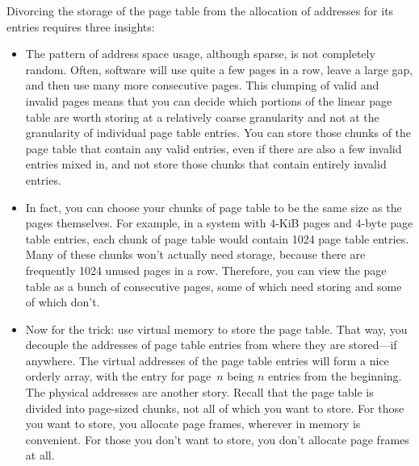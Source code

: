 Divorcing the storage of the page table from the allocation of addresses for its entries requires three insights:
\begin{itemize}
\item
The pattern of address space usage, although sparse, is not completely
random.  Often, software will use quite a few pages in a row,
leave a large gap, and then use many more consecutive pages.  This
clumping of valid and invalid pages means that you can decide which
portions of the linear page table are worth storing at a relatively
coarse granularity and not at the granularity of individual page table
entries.  You can store those chunks of the page table that contain any
valid entries, even if there are also a few invalid entries mixed in,
and not store those chunks that contain entirely invalid entries.
\item
In fact, you can choose your chunks of page table to be the same size as
the pages themselves.  For example, in a system with 4-KiB pages and
4-byte page table entries, each chunk of page table would contain
1024 page table entries.  Many of these chunks won't actually need
storage, because there are frequently 1024 unused pages in a row.  Therefore,
you can view the page table as a bunch of
consecutive pages, some of which need storing and some of which don't.
\item
Now for the trick: use virtual memory to store the page table. That
way, you decouple the addresses of page table entries from where they
are stored---if anywhere.  The virtual addresses of the page table
entries will form a nice orderly array, with the entry for page~$n$
being $n$ entries from the beginning.  The physical addresses are
another story.  Recall that the page table is divided into page-sized
chunks, not all of which you want to store.  For those you want to
store, you allocate page frames, wherever in memory is convenient.  For
those you don't want to store, you don't allocate page frames at all.
\end{itemize}


